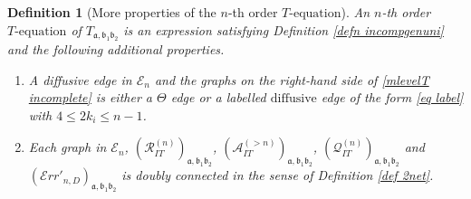 \documentclass{article}
\newcommand{\1}{\mathds{1}}
\numberwithin{equation}{section}
\newcommand{\fa}{{\mathfrak a}}
\newcommand{\fb}{{\mathfrak b}}
\renewcommand{\leq}{\leqslant}
\renewcommand{\le}{\leq}
\newcommand{\dashed}{\text{diffusive}}
\theoremstyle{plain} %
\newtheorem{definition}[theorem]{Definition}
\theoremstyle{remark}
\newcommand{\cor}{\color{red}}
\newcommand{\Sele}{{\mathcal E}}
\newcommand{\incomp}{{\text{$T$-equation}}}
\newcommand{\PITn}{{\mathcal R_{IT}^{(n)}}}
\newcommand{\QITn}{{\mathcal Q_{IT}^{(n)}}}
\newcommand{\AITn}{{\mathcal A_{IT}^{(>n)}}}
\newcommand{\Err}{{\mathcal Err}}
\begin{document}

 \begin{definition} [More properties of the $n$-th order $\incomp$]\label{def incompgenuni}
 An $n$-th order $\incomp$ of $T_{\fa,\fb_1 \fb_2}$ is an expression satisfying Definition \ref{defn incompgenuni} and the following additional properties.
\begin{enumerate}
	
	
	\item A diffusive edge in $\Sele_n$ and the graphs on the right-hand side of \eqref{mlevelT incomplete} is either a $\Theta$ edge or a labelled $\dashed$ edge of the form \eqref{eq label} with $4\le 2k_i \le n-1$. %
	
	
	\item Each graph in $\Sele_n$, $(\PITn)_{\fa,\fb_1\fb_2}$, $(\AITn)_{\fa,\fb_1\fb_2}$, $(\QITn)_{\fa,\fb_1\fb_2}$ and $(\Err'_{n,D})_{\fa,\fb_1\fb_2}$ is doubly connected in the sense of Definition \ref{def 2net}. 
\end{enumerate}

\end{definition}
\end{document}

